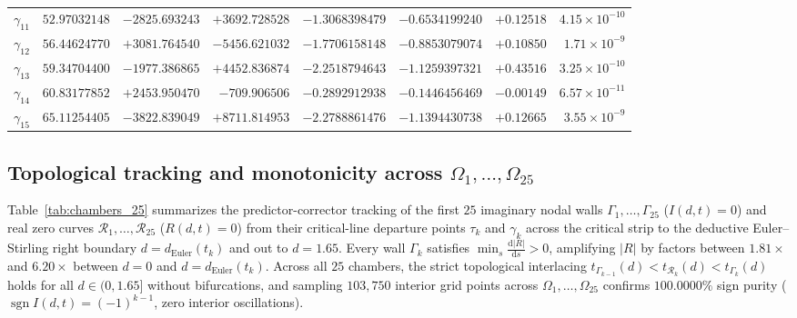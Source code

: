 \documentclass[11pt,a4paper,reqno]{amsart}
\theoremstyle{definition}
\theoremstyle{remark}
\numberwithin{equation}{section}
\newcommand{\dd}{\mathrm{d}}
\begin{document}
\begin{table}[htbp]
\begin{tabular}{crrrrrrr}
$\gamma_{11}$ & $52.97032148$ & $-2825.693243$ & $+3692.728528$ & $-1.3068398479$ & $-0.6534199240$ & $+0.12518$ & $4.15 \times 10^{-10}$ \\
$\gamma_{12}$ & $56.44624770$ & $+3081.764540$ & $-5456.621032$ & $-1.7706158148$ & $-0.8853079074$ & $+0.10850$ & $1.71 \times 10^{-9}$  \\
$\gamma_{13}$ & $59.34704400$ & $-1977.386865$ & $+4452.836874$ & $-2.2518794643$ & $-1.1259397321$ & $+0.43516$ & $3.25 \times 10^{-10}$ \\
$\gamma_{14}$ & $60.83177852$ & $+2453.950470$ & $-709.906506$  & $-0.2892912938$ & $-0.1446456469$ & $-0.00149$ & $6.57 \times 10^{-11}$ \\
$\gamma_{15}$ & $65.11254405$ & $-3822.839049$ & $+8711.814953$ & $-2.2788861476$ & $-1.1394430738$ & $+0.12665$ & $3.55 \times 10^{-9}$  \\
\bottomrule
\end{tabular}
\end{table}

\subsection{Topological tracking and monotonicity across \texorpdfstring{$\Omega_1, \dots, \Omega_{25}$}{Omega\_1..Omega\_25}}\label{subsec:num_chambers}

Table~\ref{tab:chambers_25} summarizes the predictor-corrector tracking of the first $25$ imaginary nodal walls $\Gamma_1, \dots, \Gamma_{25}$ ($I(d,t) = 0$) and real zero curves $\mathcal{R}_1, \dots, \mathcal{R}_{25}$ ($R(d,t) = 0$) from their critical-line departure points $\tau_k$ and $\gamma_k$ across the critical strip to the deductive Euler--Stirling right boundary $d = d_{\mathrm{Euler}}(t_k)$ and out to $d = 1.65$. Every wall $\Gamma_k$ satisfies $\min_{s} \frac{\dd|R|}{\dd s} > 0$, amplifying $|R|$ by factors between $1.81\times$ and $6.20\times$ between $d = 0$ and $d = d_{\mathrm{Euler}}(t_k)$. Across all $25$ chambers, the strict topological interlacing $t_{\Gamma_{k-1}}(d) < t_{\mathcal{R}_k}(d) < t_{\Gamma_k}(d)$ holds for all $d \in (0, 1.65]$ without bifurcations, and sampling $103{,}750$ interior grid points across $\Omega_1, \dots, \Omega_{25}$ confirms $100.0000\%$ sign purity ($\operatorname{sgn} I(d,t) = (-1)^{k-1}$, zero interior oscillations).
\end{document}
